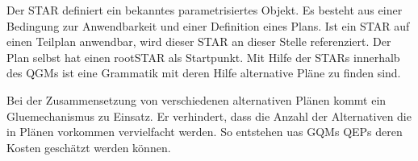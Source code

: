 Der \ac{STAR} definiert ein bekanntes parametrisiertes Objekt. Es besteht aus einer Bedingung zur Anwendbarkeit und einer Definition  eines Plans. Ist ein STAR auf einen Teilplan anwendbar, wird dieser STAR an dieser Stelle referenziert. Der Plan selbst hat einen rootSTAR als Startpunkt. Mit Hilfe der STARs innerhalb des \ac{QGM}s ist eine Grammatik mit deren Hilfe alternative Pläne zu finden sind. 

Bei der Zusammensetzung von verschiedenen alternativen Plänen kommt ein Gluemechanismus zu Einsatz. Er verhindert, dass die Anzahl der Alternativen die in Plänen vorkommen vervielfacht werden. So entstehen uas GQMs QEPs deren Kosten geschätzt werden können.

